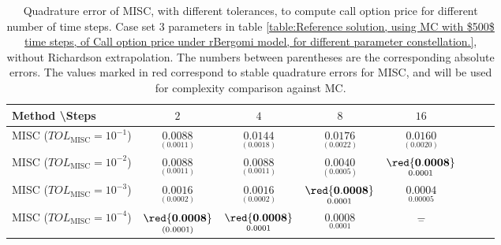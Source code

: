 \begin{table}[h!]
	\centering
	\begin{tabular}{l*{6}{c}r}
		Method \textbackslash  Steps            & $2$ & $4$ & $8$ & $16$  \\
		\hline
		MISC ($TOL_{\text{MISC}}=10^{-1}$)  & $\underset{(   0.0011)}{\mathbf{  0.0088}}$ & $\underset{(
			0.0018)}{\mathbf{ 0.0144}}$& $\underset{( 0.0022)}{\mathbf{0.0176}}$  & $\underset{(  0.0020)}{\mathbf{ 0.0160}}$   \\
		MISC ($TOL_{\text{MISC}}=10^{-2}$)  & $\underset{(   0.0011)}{\mathbf{  0.0088}}$ & $\underset{(0.0011
			)}{\mathbf{ 0.0088
		}}$ & $\underset{(0.0005)}{\mathbf{ 0.0040
		}}$ & $\underset{0.0001}{\mathbf{\red{0.0008}}}$  \\
		MISC ($TOL_{\text{MISC}}=10^{-3}$)  & $\underset{( 0.0002)}{\mathbf{    0.0016}}$ & $\underset{(0.0002
			)}{\mathbf{ 0.0016
		}}$ & $\underset{0.0001}{\mathbf{\red{0.0008}}}$ & $\underset{0.00005}{\mathbf{0.0004}}$ \\
		MISC ($TOL_{\text{MISC}}=10^{-4}$)  & $\underset{( 0.0001)}{\mathbf{    \red{0.0008}}}$ & $\underset{0.0001}{\mathbf{\red{0.0008}}}$& $\underset{0.0001}{\mathbf{0.0008}}$ & $\underset{-}{\mathbf{-}}$  \\
		
%		
		\hline
		
	\end{tabular}
	\caption{Quadrature error of MISC, with different tolerances,  to compute call option price  for different number of time steps. Case  set $3$ parameters in table \ref{table:Reference solution, using MC with $500$ time steps, of Call option price under rBergomi model, for different parameter constellation.}, without Richardson extrapolation. The numbers between parentheses are the corresponding absolute errors. The values marked in red correspond to stable quadrature errors for MISC, and will be used for complexity comparison against MC.}
	\label{Quadrature error of MISC to compute Call option price of the different tolerances for different number of time steps. Case  set $3$ parameters, without Richardson extrapolation. The numbers between parentheses are the corresponding absolute errors.}
\end{table}


